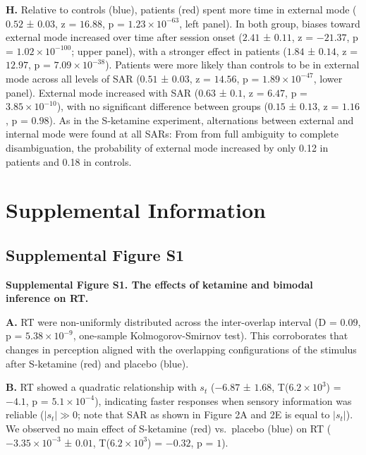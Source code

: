 \documentclass[
]{article}
\begin{document}
\textbf{H.} Relative to controls (blue), patients (red) spent more time
in external mode (\(0.52\) ± \(0.03\), z = \(16.88\), p =
\(\ensuremath{1.23\times 10^{-63}}\), left panel). In both group, biases
toward external mode increased over time after session onset (\(2.41\) ±
\(0.11\), z = \(-21.37\), p = \(\ensuremath{1.02\times 10^{-100}}\);
upper panel), with a stronger effect in patients (\(1.84\) ± \(0.14\), z
= \(12.97\), p = \(\ensuremath{7.09\times 10^{-38}}\)). Patients were
more likely than controls to be in external mode across all levels of
SAR (\(0.51\) ± \(0.03\), z = \(14.56\), p =
\(\ensuremath{1.89\times 10^{-47}}\), lower panel). External mode
increased with SAR (\(0.63\) ± \(0.1\), z = \(6.47\), p =
\(\ensuremath{3.85\times 10^{-10}}\)), with no significant difference
between groups (\(0.15\) ± \(0.13\), z = \(1.16\), p = \(0.98\)). As in
the S-ketamine experiment, alternations between external and internal
mode were found at all SARs: From from full ambiguity to complete
disambiguation, the probability of external mode increased by only 0.12
in patients and 0.18 in controls.

\newpage

\hypertarget{supplemental-information}{%
\section{Supplemental Information}\label{supplemental-information}}

\hypertarget{supplemental-figure-s1}{%
\subsection{Supplemental Figure S1}\label{supplemental-figure-s1}}


\textbf{Supplemental Figure S1. The effects of ketamine and bimodal
inference on RT.}

\textbf{A.} RT were non-uniformly distributed across the inter-overlap
interval (D = \(0.09\), p = \(\ensuremath{5.38\times 10^{-9}}\),
one-sample Kolmogorov-Smirnov test). This corroborates that changes in
perception aligned with the overlapping configurations of the stimulus
after S-ketamine (red) and placebo (blue).

\textbf{B.} RT showed a quadratic relationship with \(s_t\) (\(-6.87\) ±
\(1.68\), T(\(\ensuremath{6.2\times 10^{3}}\)) = \(-4.1\), p =
\(\ensuremath{5.1\times 10^{-4}}\)), indicating faster responses when
sensory information was reliable (\(|s_t| \gg 0\); note that SAR as
shown in Figure 2A and 2E is equal to \(|s_t|\)). We observed no main
effect of S-ketamine (red) vs.~placebo (blue) on RT
(\(\ensuremath{-3.35\times 10^{-3}}\) ± \(0.01\),
T(\(\ensuremath{6.2\times 10^{3}}\)) = \(-0.32\), p = \(1\)).
\end{document}
